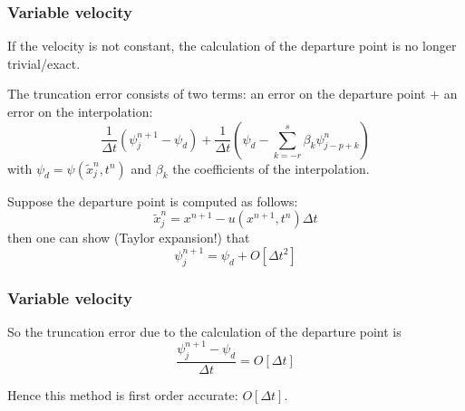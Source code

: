 \documentclass[aspectratio=43,9pt]{beamer}
\begin{document}
%
%
\begin{frame}
	\frametitle{Variable velocity}
	\begin{myitemize}{2ex}
		\item If the velocity is not constant, the calculation of the departure point is no longer trivial/exact.
		\item The truncation error consists of two terms: an error on the departure point $+$ an error on the interpolation:\vspace*{-1pt}
			\begin{equation*}
				\frac{1}{\Delta t}\left(\psi_j^{n+1} - \psi_d\right) + \frac{1}{\Delta t} \left( \psi_d - \sum_{k=-r}^s \beta_k \psi_{j-p+k}^n\right)
			\end{equation*}
			with $\psi_d = \psi (\tilde x_j^n, t^n)$ and $\beta_k$ the coefficients of the interpolation.
		\item Suppose the departure point is computed as follows:
			\begin{equation*}
				\tilde x_j^n = x^{n+1} - u(x^{n+1}, t^n ) \Delta t
			\end{equation*}
			then one can show (Taylor expansion!) that
			\begin{equation*}
				\psi_j^{n+1} = \psi_d + O [ \Delta t^2 ]
			\end{equation*}
	\end{myitemize}
\end{frame}
%
%
\begin{frame}
	\frametitle{Variable velocity}
	\begin{myitemize}{2ex}
		\item So the truncation error due to the calculation of the departure point is
			\begin{equation*}
				\frac{\psi_j^{n+1} - \psi_d}{\Delta t} = O [ \Delta t ]
			\end{equation*}
		\item Hence this method is first order accurate: $O [ \Delta t ]$.
	\end{myitemize}
\end{frame}
%
%
\end{document}
